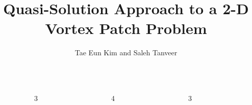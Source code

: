 \documentclass[final]{beamer}
\title{Quasi-Solution Approach to a 2-D Vortex Patch Problem}
\author{Tae Eun Kim and Saleh Tanveer}
\institute{Department of Mathematics, The Ohio State University}
\begin{document}
\begin{frame}[t]
  \begin{columns}[t]
    \begin{column}{\sepwid}\end{column}

    \begin{column}{3\tithewid}
      
    \end{column}

    \begin{column}{\sepwid}\end{column}

    \begin{column}{4\tithewid}
      
    \end{column}

    \begin{column}{\sepwid}\end{column}

    \begin{column}{3\tithewid}
      
    \end{column}

    \begin{column}{\sepwid}\end{column}
  \end{columns}

\end{frame}
\end{document}
